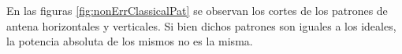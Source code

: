 En las figuras \ref{fig:nonErrClassicalPat} se observan los cortes de los patrones de antena horizontales y 
verticales. Si bien dichos patrones son iguales a los ideales, la potencia absoluta de los mismos no es la misma.
\begin{figure}[H]
	\centering
 	


\end{figure}
